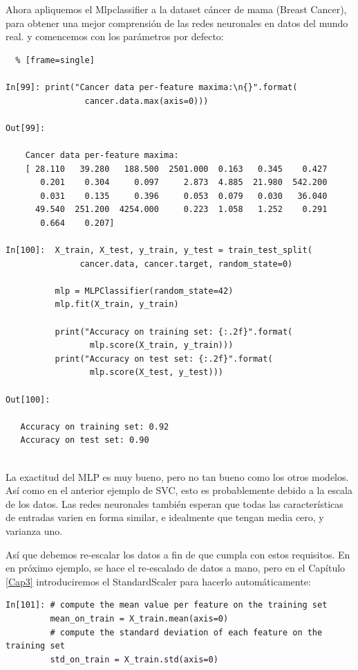 {Ahora apliquemos el  {\ttfamily  Mlpclassifier} a la dataset  cáncer de mama (Breast Cancer), para obtener una mejor comprensión de las redes neuronales en datos del mundo real. y comencemos  con los parámetros 
por defecto: \\

\begin{lstlisting}  % [frame=single]	

In[99]: print("Cancer data per-feature maxima:\n{}".format(
                cancer.data.max(axis=0)))

Out[99]:

    Cancer data per-feature maxima:
    [ 28.110   39.280   188.500  2501.000  0.163   0.345    0.427
       0.201    0.304     0.097     2.873  4.885  21.980  542.200
       0.031    0.135     0.396     0.053  0.079   0.030   36.040
      49.540  251.200  4254.000     0.223  1.058   1.252    0.291
       0.664    0.207]
      
In[100]:  X_train, X_test, y_train, y_test = train_test_split(
               cancer.data, cancer.target, random_state=0)
       
          mlp = MLPClassifier(random_state=42)
          mlp.fit(X_train, y_train)
   
          print("Accuracy on training set: {:.2f}".format(
                 mlp.score(X_train, y_train)))
          print("Accuracy on test set: {:.2f}".format(
                 mlp.score(X_test, y_test)))

Out[100]:
   
   Accuracy on training set: 0.92
   Accuracy on test set: 0.90


\end{lstlisting}


La exactitud  del MLP es muy  bueno, pero no tan bueno como los otros modelos. Así como en el anterior ejemplo de SVC, esto es probablemente debido a la escala de los datos. Las redes neuronales también esperan que todas las características de entradas  varien en forma similar, e idealmente que tengan media cero, y varianza uno.

 Así que debemos re-escalar los datos a fin de que cumpla con estos requisitos. En en próximo ejemplo, se hace el re-escalado de datos a mano, pero en el Capítulo \ref{Cap3} introduciremos  el  StandardScaler para hacerlo automáticamente:\\

\begin{lstlisting} 
In[101]: # compute the mean value per feature on the training set
         mean_on_train = X_train.mean(axis=0)
         # compute the standard deviation of each feature on the training set
         std_on_train = X_train.std(axis=0)
   

\end{lstlisting}}
